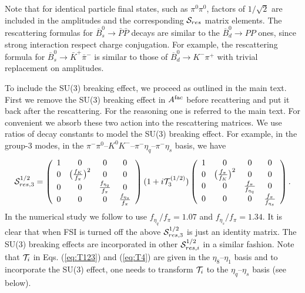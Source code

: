 \documentclass[aps,preprint,floats,epsf,epsfig,nofootinbib,letter]{revtex4}
\newcommand{\be}{\begin{eqnarray}}
\newcommand{\Sc}{{\cal S}}
\newcommand{\T}{{\cal T}}
\begin{document}
%
%
%
Note that for identical particle final states,
such as $\pi^0\pi^0$, factors of $1/\sqrt2$ are included in the
amplitudes and the corresponding $\Sc_{res}$ matrix elements. 
The rescattering formulas for $\overline B^{0}_s\to \bar P\bar P$ decays are similar to the $\overline B^{0}_d\to PP$ ones, since strong interaction respect charge conjugation. For example, the rescattering formula for $\overline B^{0}_s\to \bar K^+\bar \pi^-$ is similar to those of $\overline B^{0}_d\to K^-\pi^+$ with trivial replacement on amplitudes.

To include the SU(3) breaking effect, we proceed as outlined in the main text.
First we remove the SU(3) breaking effect in $A^{\rm fac}$ before recattering and put it back after the rescattering. 
For the reasoning one is referred to the main text. 
For convenient we absorb these two action into the rescattering matrices. 
We use ratios of decay constants to model the SU(3) breaking effect. 
For example, in the group-3 modes, in the $\pi^-\pi^0$--$K^0 K^-$--$\pi^- \eta_q$--$\pi^- \eta_s$ basis, we have
\be
\Sc_{res,3}^{1/2}=
 \left(
\begin{array}{cccc}
 1 &0 &0 &0\\
 0 &\big(\frac{f_K}{f_\pi}\big)^2 &0 &0\\
 0 &0 &\frac{f_{\eta_q}}{f_\pi} &0\\
 0 &0 &0 &\frac{f_{\eta_s}}{f_\pi}
\end{array}
\right)
(1+i\T_3^{(1/2)})
 \left(
\begin{array}{cccc}
 1 &0 &0 &0\\
 0 &\big(\frac{f_\pi}{f_K}\big)^2 &0 &0\\
 0 &0 &\frac{f_\pi}{f_{\eta_q}} &0\\
 0 &0 &0 &\frac{f_\pi}{f_{\eta_s}}
\end{array}
\right).
\end{eqnarray}
In the numerical study we follow \cite{Feldmann:1998vh} to use $f_{\eta_q}/f_\pi=1.07$ and $f_{\eta_s}/f_\pi=1.34$.
It is clear that when FSI is turned off the above $\Sc_{res,3}^{1/2}$ is just an identity matrix.
The SU(3) breaking effects are incorporated in other $\Sc_{res,i}^{1/2}$ in a similar fashion.
Note that $\T_i$ in Eqs. (\ref{eq:T123}) and (\ref{eq:T4}) are given in the $\eta_8$--$\eta_1$ basis 
and to incorporate the SU(3) effect, one needs to transform $\T_i$ to the $\eta_q$--$\eta_s$ basis (see below). 
\end{document}
